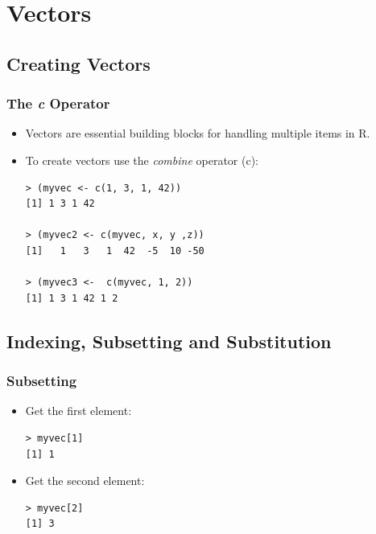 \documentclass[xcolor=dvipsnames, xcolor=table]{beamer} %
\theoremstyle{mystyle}
\begin{document}



\section{Vectors}
\subsection{Creating Vectors}


\begin{frame}[fragile] %

\frametitle{The \textit{c} Operator}

\begin{itemize}
\item Vectors are essential building blocks for handling multiple items in R.  
\item To create vectors use the \textit{combine} operator (c):
\begin{verbatim}
> (myvec <- c(1, 3, 1, 42))
[1] 1 3 1 42

> (myvec2 <- c(myvec, x, y ,z))
[1]   1   3   1  42  -5  10 -50

> (myvec3 <-  c(myvec, 1, 2))
[1] 1 3 1 42 1 2
\end{verbatim}

\end{itemize}

\end{frame}

\subsection{Indexing, Subsetting and Substitution}


\begin{frame}[fragile] %
\frametitle{Subsetting}

\begin{itemize}
\item Get the first element:

\begin{verbatim}
> myvec[1]
[1] 1
\end{verbatim}

\item Get the second element:

\begin{verbatim}
> myvec[2]
[1] 3
\end{verbatim}

\end{itemize}

\end{frame}
\end{document}
